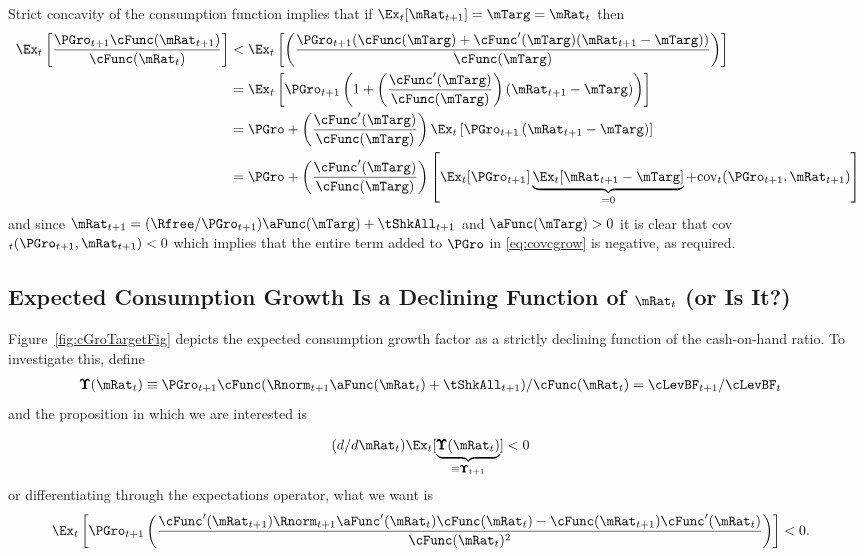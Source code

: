 \documentclass[./BufferStockTheory.tex]{subfiles}
\begin{document}
Strict concavity of the consumption function implies that if $\Ex_{t}[{\mRat}_{t+1}] = \mTarg = \mRat_{t}$ then
\begin{align}
\Ex_{t}\left[\frac{{\PGro}_{t+1} \cFunc({\mRat}_{t+1})}{\cFunc(\mRat_{t})}
\right]  & < \Ex_{t}\left[\left(\frac{{\PGro}_{t+1}
(\cFunc(\mTarg)+\cFunc^{\prime}(\mTarg)({\mRat}_{t+1}-\mTarg))}{\cFunc(\mTarg)}\right)\right]  \nonumber \\
 & = \Ex_{t}\left[{\PGro}_{t+1} \left(1+\left(\frac{\cFunc^{\prime}(\mTarg)}{%
\cFunc(\mTarg)}\right)({\mRat}_{t+1}-\mTarg)\right)\right]  \nonumber  \\
 & = \PGro + \left(\frac{\cFunc^{\prime}(\mTarg)}{\cFunc(\mTarg)}\right)\Ex_{t}\left[ {\PGro}_{t+1}\left({\mRat}_{t+1}-\mTarg\right)\right]  \nonumber \\
 & = \PGro + \left(\frac{\cFunc^{\prime}(\mTarg)}{\cFunc(\mTarg)}\right)\left[
\Ex_{t}[ \PGro_{t+1}]\underbrace{\Ex_{t}[
{\mRat}_{t+1}-\mTarg]}_{=0}+\mbox{cov}_{t}( {\PGro}_{t+1},{\mRat}_{t+1})\right]
 \label{eq:covcgrow}
\end{align}
and since $\mRat_{t+1} = (\Rfree/\PGro_{t+1}) \aFunc(\mTarg)+\tShkAll_{t+1}$ and
$\aFunc(\mTarg)>0$ it is clear that
cov$_{t}({\PGro}_{t+1},{\mRat}_{t+1})<0$ which implies that
the entire term added to $\PGro$ in \eqref{eq:covcgrow} is negative, as
required.

\hypertarget{dcgdxneg}{}
\subsection{Expected Consumption Growth Is a Declining Function of $\mRat_{t}$ (or Is It?)}
\label{subsec:dcgdxneg}

Figure~\ref{fig:cGroTargetFig} depicts the expected consumption growth factor as a strictly
declining function of the cash-on-hand ratio. To investigate this,
define
\begin{align*}
\pmb{\Upsilon}(\mRat_{t})  & \equiv  \PGro_{t+1} \cFunc(\Rnorm_{t+1}\aFunc(\mRat_{t})+\tShkAll_{t+1})/\cFunc(\mRat_{t})  = \cLevBF_{t+1}/\cLevBF_{t}
\end{align*}
and the proposition in which we are interested is

\begin{align}
  (d/d\mRat_{t})\Ex_{t}[\underbrace{\pmb{\Upsilon}(\mRat_{t})}_{\equiv \pmb{\Upsilon}_{t+1}}]  & < 0  \nonumber
\end{align}
or differentiating through the expectations operator, what we want is
\begin{align}
\Ex_{t}\left[\PGro_{t+1} \left(\frac{\cFunc^{\prime}(\mRat_{t+1})\Rnorm_{t+1}\aFunc^{\prime}(\mRat_{t})\cFunc(\mRat_{t})-\cFunc(\mRat_{t+1})\cFunc^{\prime}(\mRat_{t})}{\cFunc(\mRat_{t})^{2}}\right)\right]  & < 0 \label{eq:kappaPrimeLT0}.
\end{align}
\end{document}
